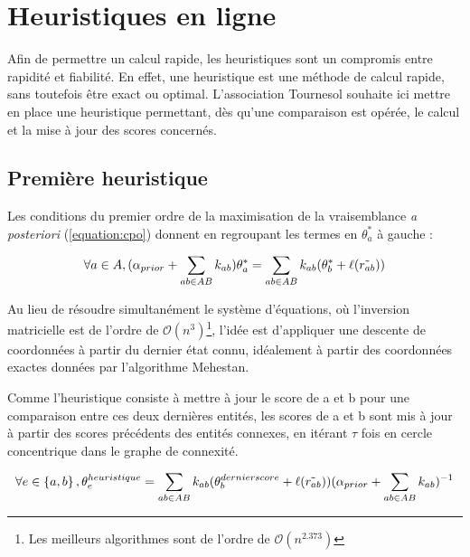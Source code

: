 \section{Heuristiques en ligne}
Afin de permettre un calcul rapide, les heuristiques sont un compromis entre rapidité et fiabilité. En effet, une heuristique est une méthode de calcul rapide, sans toutefois être exact ou optimal. L'association Tournesol souhaite ici mettre en place une heuristique permettant, dès qu'une comparaison est opérée, le calcul et la mise à jour des scores concernés.

\subsection{Première heuristique}

Les conditions du premier ordre de la maximisation de la vraisemblance \textit{a posteriori} (\ref{equation:cpo}) donnent en regroupant les termes en $\theta^{*}_a$ à gauche :

\begin{equation}
 \forall a \in A,   (\alpha_{prior} + \sum_{ab \in AB} k_{ab}) \theta^{*}_a = \sum_{ab \in AB} k_{ab}(\theta^{*}_b + \ell(\Tilde{r_{ab}}))
\end{equation}

Au lieu de résoudre simultanément le système d'équations, où l'inversion matricielle est de l'ordre de $\mathcal{O}(n^3)$\footnote{Les meilleurs algorithmes sont de l'ordre de $\mathcal{O}(n^{2.373})$}, l'idée est d'appliquer une descente de coordonnées à partir du dernier état connu, idéalement à partir des coordonnées exactes données par l'algorithme Mehestan. 

Comme l'heuristique consiste à mettre à jour le score de a et b pour une comparaison entre ces deux dernières entités, les scores de a et b sont mis à jour à partir des scores précédents des entités connexes, en itérant $\tau$ fois en cercle concentrique dans le graphe de connexité.

\begin{equation}
  \forall e \in \left\lbrace a,b \right\rbrace, \theta^{heuristique}_e = \sum_{ab \in AB} k_{ab}(\theta^{dernier score}_b + \ell(\Tilde{r_{ab}})) (\alpha_{prior} + \sum_{ab \in AB} k_{ab})^{-1}
\end{equation}

\pagebreak

